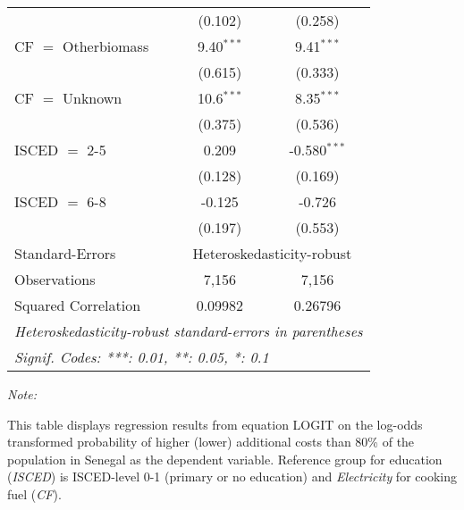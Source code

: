 \begin{table}[htbp!]
\begin{adjustbox}{width = 1\textwidth, max height = 0.95\textheight, center}
\begin{threeparttable}[b]
\begin{tabular}{lcc}
                                 & (0.102)       & (0.258)\\   
            CF $=$ Otherbiomass  & 9.40$^{***}$  & 9.41$^{***}$\\   
                                 & (0.615)       & (0.333)\\   
            CF $=$ Unknown       & 10.6$^{***}$  & 8.35$^{***}$\\   
                                 & (0.375)       & (0.536)\\   
            ISCED $=$ 2-5        & 0.209         & -0.580$^{***}$\\   
                                 & (0.128)       & (0.169)\\   
            ISCED $=$ 6-8        & -0.125        & -0.726\\   
                                 & (0.197)       & (0.553)\\   
            \midrule 
            Standard-Errors & \multicolumn{2}{c}{Heteroskedasticity-robust} \\ 
            Observations         & 7,156         & 7,156\\  
            Squared Correlation  & 0.09982       & 0.26796\\  
            \midrule \midrule
            \multicolumn{3}{l}{\emph{Heteroskedasticity-robust standard-errors in parentheses}}\\
            \multicolumn{3}{l}{\emph{Signif. Codes: ***: 0.01, **: 0.05, *: 0.1}}\\
         \end{tabular}
         
         \begin{tablenotes}\item \medskip \textit{Note:}
            \item This table displays regression results from equation LOGIT on the log-odds transformed probability of higher (lower) additional costs than 80\% of the population in Senegal as the dependent variable. Reference group for education (\textit{ISCED}) is ISCED-level 0-1 (primary or no education) and \textit{Electricity} for cooking fuel (\textit{CF}).
         \end{tablenotes}
      \end{threeparttable}
   \end{adjustbox}
\end{table}


